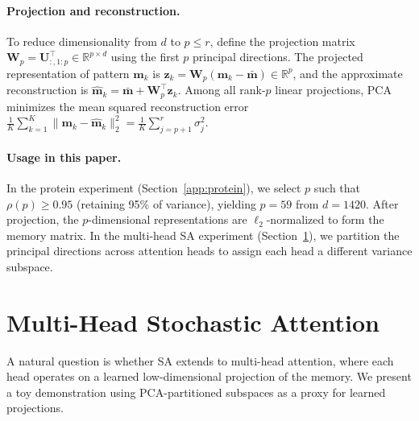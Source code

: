 \paragraph{Projection and reconstruction.}
To reduce dimensionality from $d$ to $p \le r$, define the projection matrix $\mathbf{W}_p = \mathbf{U}_{:,1:p}^\top \in \mathbb{R}^{p \times d}$ using the first $p$ principal directions. The projected representation of pattern $\mathbf{m}_k$ is $\mathbf{z}_k = \mathbf{W}_p(\mathbf{m}_k - \bar{\mathbf{m}}) \in \mathbb{R}^p$, and the approximate reconstruction is $\hat{\mathbf{m}}_k = \bar{\mathbf{m}} + \mathbf{W}_p^\top\mathbf{z}_k$. Among all rank-$p$ linear projections, PCA minimizes the mean squared reconstruction error $\frac{1}{K}\sum_{k=1}^{K}\|\mathbf{m}_k - \hat{\mathbf{m}}_k\|_2^2 = \frac{1}{K}\sum_{j=p+1}^{r}\sigma_j^2$.

\paragraph{Usage in this paper.}
In the protein experiment (Section~\ref{app:protein}), we select $p$ such that $\rho(p) \ge 0.95$ (retaining 95\% of variance), yielding $p{=}59$ from $d{=}1420$. After projection, the $p$-dimensional representations are $\ell_2$-normalized to form the memory matrix. In the multi-head SA experiment (Section~\ref{app:multihead}), we partition the principal directions across attention heads to assign each head a different variance subspace.

\section{Multi-Head Stochastic Attention}\label{app:multihead}

A natural question is whether SA extends to multi-head attention, where each head operates on a learned low-dimensional projection of the memory. We present a toy demonstration using PCA-partitioned subspaces as a proxy for learned projections.

